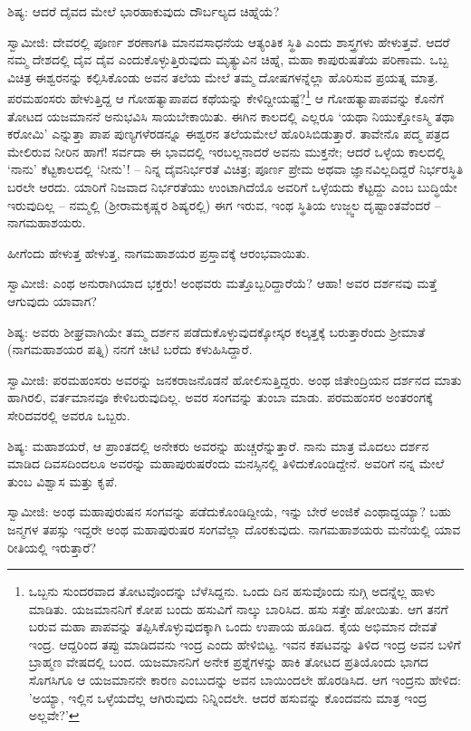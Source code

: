 ಶಿಷ್ಯ: ಆದರೆ ದೈವದ ಮೇಲೆ ಭಾರಹಾಕುವುದು ದೌರ್ಬಲ್ಯದ ಚಿಹ್ನೆಯೆ?

ಸ್ವಾಮೀಜಿ: ದೇವರಲ್ಲಿ ಪೂರ್ಣ ಶರಣಾಗತಿ ಮಾನವಸಾಧನೆಯ ಆತ್ಯಂತಿಕ ಸ್ಥಿತಿ ಎಂದು ಶಾಸ್ತ್ರಗಳು ಹೇಳುತ್ತವೆ. ಆದರೆ ನಮ್ಮ ದೇಶದಲ್ಲಿ ದೈವ ದೈವ ಎಂದುಕೊಳ್ಳುತ್ತಿರುವುದು ಮೃತ್ಯುವಿನ ಚಿಹ್ನೆ, ಮಹಾ ಕಾಪುರುಷತೆಯ ಪರಿಣಾಮ. ಒಬ್ಬ ವಿಚಿತ್ರ ಈಶ್ವರನನ್ನು ಕಲ್ಪಿಸಿಕೊಂಡು ಅವನ ತಲೆಯ ಮೇಲೆ ತಮ್ಮ ದೋಷಗಳನ್ನೆಲ್ಲಾ ಹೊರಿಸುವ ಪ್ರಯತ್ನ ಮಾತ್ರ. ಪರಮಹಂಸರು ಹೇಳುತ್ತಿದ್ದ ಆ ಗೋಹತ್ಯಾಪಾಪದ ಕಥೆಯನ್ನು ಕೇಳಿದ್ದೀಯಷ್ಟೆ?\footnote{ಒಬ್ಬನು ಸುಂದರವಾದ ತೋಟವೊಂದನ್ನು ಬೆಳೆಸಿದ್ದನು. ಒಂದು ದಿನ ಹಸುವೊಂದು ನುಗ್ಗಿ ಅದನ್ನೆಲ್ಲ ಹಾಳು ಮಾಡಿತು. ಯಜಮಾನನಿಗೆ ಕೋಪ ಬಂದು ಹಸುವಿಗೆ ನಾಲ್ಕು ಬಾರಿಸಿದ. ಹಸು ಸತ್ತೇ ಹೋಯಿತು. ಆಗ ತನಗೆ ಬರುವ ಮಹಾ ಪಾಪವನ್ನು ತಪ್ಪಿಸಿಕೊಳ್ಳುವುದಕ್ಕಾಗಿ ಒಂದು ಉಪಾಯ ಹೂಡಿದ. ಕೈಯ ಅಭಿಮಾನ ದೇವತೆ ಇಂದ್ರ. ಆದ್ದರಿಂದ ತಪ್ಪು ಮಾಡಿದವನು ಇಂದ್ರ ಎಂದು ಹೇಳಿಬಿಟ್ಟ. ಇವನ ಕಪಟವನ್ನು ತಿಳಿದ ಇಂದ್ರ ಅವನ ಬಳಿಗೆ ಬ್ರಾಹ್ಮಣ ವೇಷದಲ್ಲಿ ಬಂದ. ಯಜಮಾನನಿಗೆ ಅನೇಕ ಪ್ರಶ್ನೆಗಳನ್ನು ಹಾಕಿ ತೋಟದ ಪ್ರತಿಯೊಂದು ಭಾಗದ ಸೊಗಸಿಗೂ ಆ ಯಜಮಾನನೇ ಕಾರಣ ಎಂಬುದನ್ನು ಅವನ ಬಾಯಿಂದಲೇ ಹೊರಡಿಸಿದ. ಆಗ ಇಂದ್ರನು ಹೇಳಿದ: 'ಅಯ್ಯಾ, ಇಲ್ಲಿನ ಒಳ್ಳೆಯದೆಲ್ಲ ಆಗಿರುವುದು ನಿನ್ನಿಂದಲೇ. ಆದರೆ ಹಸುವನ್ನು ಕೊಂದವನು ಮಾತ್ರ ಇಂದ್ರ ಅಲ್ಲವೇ?'} ಆ ಗೋಹತ್ಯಾಪಾಪವನ್ನು ಕೊನೆಗೆ ತೋಟದ ಯಜಮಾನನೆ ಅನುಭವಿಸಿ ಸಾಯಬೇಕಾಯಿತು. ಈಗಿನ ಕಾಲದಲ್ಲಿ ಎಲ್ಲರೂ ‘ಯಥಾ ನಿಯುಕ್ತೋಽಸ್ಮಿ ತಥಾ ಕರೋಮಿ’ ಎನ್ನುತ್ತಾ ಪಾಪ ಪುಣ್ಯಗಳೆರಡನ್ನೂ ಈಶ್ವರನ ತಲೆಯಮೇಲೆ ಹೊರಿಸಿಬಿಡುತ್ತಾರೆ. ತಾವೇನೊ ಪದ್ಮ ಪತ್ರದ ಮೇಲಿರುವ ನೀರಿನ ಹಾಗೆ! ಸರ್ವದಾ ಈ ಭಾವದಲ್ಲಿ ಇರಬಲ್ಲನಾದರೆ ಅವನು ಮುಕ್ತನೇ; ಆದರೆ ಒಳ್ಳೆಯ ಕಾಲದಲ್ಲಿ ‘ನಾನು’ ಕೆಟ್ಟಕಾಲದಲ್ಲಿ ‘ನೀನು’! – ನಿನ್ನ ದೈವನಿರ್ಭರತೆ ವಿಚಿತ್ರ; ಪೂರ್ಣ ಪ್ರೇಮ ಅಥವಾ ಜ್ಞಾನವಿಲ್ಲದಿದ್ದರೆ ನಿರ್ಭರಸ್ಥಿತಿ ಬರಲೇ ಆರದು. ಯಾರಿಗೆ ನಿಜವಾದ ನಿರ್ಭರತೆಯು ಉಂಟಾಗಿದೆಯೊ ಅವರಿಗೆ ಒಳ್ಳೆಯದು ಕೆಟ್ಟದ್ದು ಎಂಬ ಬುದ್ಧಿಯೇ ಇರುವುದಿಲ್ಲ – ನಮ್ಮಲ್ಲಿ (ಶ‍್ರೀರಾಮಕೃಷ್ಣರ ಶಿಷ್ಯರಲ್ಲಿ) ಈಗ ಇರುವ, ಇಂಥ ಸ್ಥಿತಿಯ ಉಜ್ಜ್ವಲ ದೃಷ್ಟಾಂತವೆಂದರೆ – ನಾಗಮಹಾಶಯರು.

ಹೀಗೆಂದು ಹೇಳುತ್ತ ಹೇಳುತ್ತ, ನಾಗಮಹಾಶಯರ ಪ್ರಸ್ತಾವಕ್ಕೆ ಆರಂಭವಾಯಿತು.

ಸ್ವಾಮೀಜಿ: ಎಂಥ ಅನುರಾಗಿಯಾದ ಭಕ್ತರು! ಅಂಥವರು ಮತ್ತೊಬ್ಬರಿದ್ದಾರೆಯೆ? ಆಹಾ! ಅವರ ದರ್ಶನವು ಮತ್ತೆ ಆಗುವುದು ಯಾವಾಗ?

ಶಿಷ್ಯ: ಅವರು ಶೀಘ್ರವಾಗಿಯೇ ತಮ್ಮ ದರ್ಶನ ಪಡೆದುಕೊಳ್ಳುವುದಕ್ಕೋಸ್ಕರ ಕಲ್ಕತ್ತಕ್ಕೆ ಬರುತ್ತಾರೆಂದು ಶ‍್ರೀಮಾತೆ (ನಾಗಮಹಾಶಯರ ಪತ್ನಿ) ನನಗೆ ಚೀಟಿ ಬರೆದು ಕಳುಹಿಸಿದ್ದಾರೆ.

ಸ್ವಾಮೀಜಿ: ಪರಮಹಂಸರು ಅವರನ್ನು ಜನಕರಾಜನೊಡನೆ ಹೋಲಿಸುತ್ತಿದ್ದರು. ಅಂಥ ಜಿತೇಂದ್ರಿಯನ ದರ್ಶನದ ಮಾತು ಹಾಗಿರಲಿ, ವರ್ತಮಾನವೂ ಕೇಳಿಬರುವುದಿಲ್ಲ. ಅವರ ಸಂಗವನ್ನು ತುಂಬಾ ಮಾಡು. ಪರಮಹಂಸರ ಅಂತರಂಗಕ್ಕೆ ಸೇರಿದವರಲ್ಲಿ ಅವರೂ ಒಬ್ಬರು.

ಶಿಷ್ಯ: ಮಹಾಶಯರೆ, ಆ ಪ್ರಾಂತದಲ್ಲಿ ಅನೇಕರು ಅವರನ್ನು ಹುಚ್ಚರೆನ್ನುತ್ತಾರೆ. ನಾನು ಮಾತ್ರ ಮೊದಲು ದರ್ಶನ ಮಾಡಿದ ದಿವಸದಿಂದಲೂ ಅವರನ್ನು ಮಹಾಪುರುಷರೆಂದು ಮನಸ್ಸಿನಲ್ಲಿ ತಿಳಿದುಕೊಂಡಿದ್ದೇನೆ. ಅವರಿಗೆ ನನ್ನ ಮೇಲೆ ತುಂಬ ವಿಶ್ವಾಸ ಮತ್ತು ಕೃಪೆ.

ಸ್ವಾಮೀಜಿ: ಅಂಥ ಮಹಾಪುರುಷನ ಸಂಗವನ್ನು ಪಡೆದುಕೊಂಡಿದ್ದೀಯೆ, ಇನ್ನು ಬೇರೆ ಅಂಜಿಕೆ ಎಂಥಾದ್ದಯ್ಯಾ? ಬಹು ಜನ್ಮಗಳ ತಪಸ್ಸು ಇದ್ದರೇ ಅಂಥ ಮಹಾಪುರುಷರ ಸಂಗವೆಲ್ಲಾ ದೊರಕುವುದು. ನಾಗಮಹಾಶಯರು ಮನೆಯಲ್ಲಿ ಯಾವ ರೀತಿಯಲ್ಲಿ ಇರುತ್ತಾರೆ?

